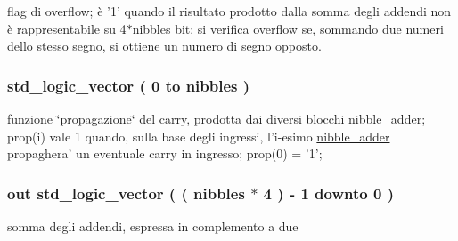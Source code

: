 flag di overflow; è '1' quando il risultato prodotto dalla somma degli addendi non è rappresentabile su 4$\ast$nibbles bit\+: si verifica overflow se, sommando due numeri dello stesso segno, si ottiene un numero di segno opposto. 

\hypertarget{group___carry_loockahead_ga19afe0b89973d7fc29362431f2e828b7}{
\subsubsection[{prop}]{ {\bfseries \textcolor{vhdlchar}{std\+\_\+logic\+\_\+vector}\textcolor{vhdlchar}{ }\textcolor{vhdlchar}{(}\textcolor{vhdlchar}{ }\textcolor{vhdlchar}{ } \textcolor{vhdldigit}{0} \textcolor{vhdlchar}{ }\textcolor{vhdlchar}{to}\textcolor{vhdlchar}{ }\textcolor{vhdlchar}{ }\textcolor{vhdlchar}{ }\textcolor{vhdlchar}{ }{\bfseries {\bf nibbles}} \textcolor{vhdlchar}{ }\textcolor{vhdlchar}{)}\textcolor{vhdlchar}{ }} \hspace{0.3cm}{\ttfamily [Signal]}}}\label{group___carry_loockahead_ga19afe0b89973d7fc29362431f2e828b7}


funzione \char`\"{}propagazione\char`\"{} del carry, prodotta dai diversi blocchi \hyperlink{classnibble__adder}{nibble\+\_\+adder}; prop(i) vale 1 quando, sulla base degli ingressi, l'i-\/esimo \hyperlink{classnibble__adder}{nibble\+\_\+adder} propaghera' un eventuale carry in ingresso; prop(0) = '1'; 

\hypertarget{group___carry_loockahead_ga1b4798a9e96bb32e9c08ce68e24e7871}{
\subsubsection[{sum}]{ {\bfseries \textcolor{vhdlchar}{out}\textcolor{vhdlchar}{ }} {\bfseries \textcolor{vhdlchar}{std\+\_\+logic\+\_\+vector}\textcolor{vhdlchar}{ }\textcolor{vhdlchar}{(}\textcolor{vhdlchar}{ }\textcolor{vhdlchar}{(}\textcolor{vhdlchar}{ }\textcolor{vhdlchar}{ }\textcolor{vhdlchar}{ }\textcolor{vhdlchar}{ }{\bfseries {\bf nibbles}} \textcolor{vhdlchar}{$\ast$}\textcolor{vhdlchar}{ } \textcolor{vhdldigit}{4} \textcolor{vhdlchar}{ }\textcolor{vhdlchar}{)}\textcolor{vhdlchar}{ }\textcolor{vhdlchar}{-\/}\textcolor{vhdlchar}{ } \textcolor{vhdldigit}{1} \textcolor{vhdlchar}{ }\textcolor{vhdlchar}{downto}\textcolor{vhdlchar}{ }\textcolor{vhdlchar}{ } \textcolor{vhdldigit}{0} \textcolor{vhdlchar}{ }\textcolor{vhdlchar}{)}\textcolor{vhdlchar}{ }} \hspace{0.3cm}{\ttfamily [Port]}}}\label{group___carry_loockahead_ga1b4798a9e96bb32e9c08ce68e24e7871}


somma degli addendi, espressa in complemento a due 

